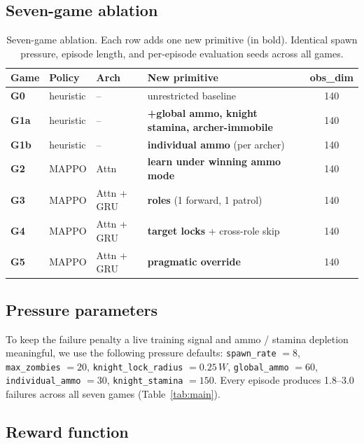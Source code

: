 \documentclass[11pt,a4paper]{article}
\newcommand{\gz}{\textbf{G0}}
\newcommand{\ga}{\textbf{G1a}}
\newcommand{\gb}{\textbf{G1b}}
\newcommand{\gii}{\textbf{G2}}
\newcommand{\giii}{\textbf{G3}}
\newcommand{\giv}{\textbf{G4}}
\newcommand{\gv}{\textbf{G5}}
\begin{document}
\subsection{Seven-game ablation}

\begin{table}[H]
\centering
\caption{Seven-game ablation. Each row adds one new primitive (in bold).
Identical spawn pressure, episode length, and per-episode evaluation
seeds across all games.}
\label{tab:games}
\small
\begin{tabular}{@{}llllc@{}}
\toprule
\textbf{Game} & \textbf{Policy} & \textbf{Arch} & \textbf{New primitive} & \textbf{obs\_dim} \\
\midrule
\gz{}   & heuristic & --          & unrestricted baseline                    & 140 \\
\ga{}   & heuristic & --          & \textbf{+global ammo, knight stamina, archer-immobile} & 140 \\
\gb{}   & heuristic & --          & \textbf{individual ammo} (per archer)    & 140 \\
\gii{}  & MAPPO     & Attn        & \textbf{learn under winning ammo mode}   & 140 \\
\giii{} & MAPPO     & Attn + GRU  & \textbf{roles} (1 forward, 1 patrol)     & 140 \\
\giv{}  & MAPPO     & Attn + GRU  & \textbf{target locks} + cross-role skip  & 140 \\
\gv{}   & MAPPO     & Attn + GRU  & \textbf{pragmatic override}              & 140 \\
\bottomrule
\end{tabular}
\end{table}

\subsection{Pressure parameters}

To keep the failure penalty a live training signal and ammo / stamina
depletion meaningful, we use the following pressure defaults:
\texttt{spawn\_rate} $= 8$, \texttt{max\_zombies} $= 20$,
\texttt{knight\_lock\_radius} $= 0.25\,W$,
\texttt{global\_ammo} $= 60$, \texttt{individual\_ammo} $= 30$,
\texttt{knight\_stamina} $= 150$. Every episode produces
1.8--3.0 failures across all seven games
(Table~\ref{tab:main}).

\subsection{Reward function}
\end{document}
